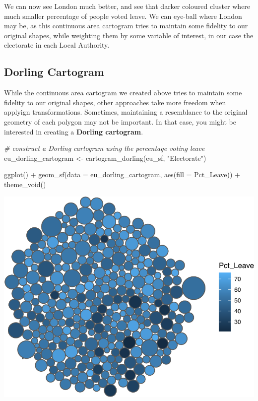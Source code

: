 \documentclass[
  krantz2]{krantz}
\makeatletter
\newenvironment{Shaded}{\begin{snugshade}}{\end{snugshade}}
\newcommand{\AttributeTok}[1]{\textcolor[rgb]{0.61,0.61,0.61}{#1}}
\newcommand{\CommentTok}[1]{\textcolor[rgb]{0.37,0.37,0.37}{\textit{#1}}}
\newcommand{\FunctionTok}[1]{\textcolor[rgb]{0,0,0}{#1}}
\newcommand{\NormalTok}[1]{#1}
\newcommand{\OtherTok}[1]{\textcolor[rgb]{0.37,0.37,0.37}{#1}}
\newcommand{\SpecialCharTok}[1]{\textcolor[rgb]{0,0,0}{#1}}
\newcommand{\StringTok}[1]{\textcolor[rgb]{0.5,0.5,0.5}{#1}}
\newenvironment{kframe}{%
\medskip{}
\setlength{\fboxsep}{.8em}
 \def\at@end@of@kframe{}%
 \ifinner\ifhmode%
  \def\at@end@of@kframe{\end{minipage}}%
  \begin{minipage}{\columnwidth}%
 \fi\fi%
 \def\FrameCommand##1{\hskip\@totalleftmargin \hskip-\fboxsep
 \colorbox{shadecolor}{##1}\hskip-\fboxsep
     \hskip-\linewidth \hskip-\@totalleftmargin \hskip\columnwidth}%
 \MakeFramed {\advance\hsize-\width
   \@totalleftmargin\z@ \linewidth\hsize
   \@setminipage}}%
 {\par\unskip\endMakeFramed%
 \at@end@of@kframe}
\renewenvironment{Shaded}{\begin{kframe}}{\end{kframe}}
\makeatother
\begin{document}
We can now see London much better, and see that darker coloured cluster where much smaller percentage of people voted leave. We can eye-ball where London may be, as this continuous area cartogram tries to maintain some fidelity to our original shapes, while weighting them by some variable of interest, in our case the electorate in each Local Authority.

\hypertarget{dorling-cartogram}{%
\subsection{Dorling Cartogram}\label{dorling-cartogram}}

While the continuous area cartogram we created above tries to maintain some fidelity to our original shapes, other approaches take more freedom when applyign transformations. Sometimes, maintaining a resemblance to the original geometry of each polygon may not be important. In that case, you might be interested in creating a \textbf{Dorling cartogram}.

\begin{Shaded}
\begin{Highlighting}[]
\CommentTok{\# construct a Dorling cartogram using the percentage voting leave}
\NormalTok{eu\_dorling\_cartogram }\OtherTok{\textless{}{-}} \FunctionTok{cartogram\_dorling}\NormalTok{(eu\_sf, }\StringTok{"Electorate"}\NormalTok{)}
\end{Highlighting}
\end{Shaded}

\begin{Shaded}
\begin{Highlighting}[]
\FunctionTok{ggplot}\NormalTok{() }\SpecialCharTok{+}
  \FunctionTok{geom\_sf}\NormalTok{(}\AttributeTok{data =}\NormalTok{ eu\_dorling\_cartogram, }\FunctionTok{aes}\NormalTok{(}\AttributeTok{fill =}\NormalTok{ Pct\_Leave)) }\SpecialCharTok{+} 
  \FunctionTok{theme\_void}\NormalTok{()}
\end{Highlighting}
\end{Shaded}

\includegraphics{crime_mapping_files/figure-latex/unnamed-chunk-139-1.pdf}
\end{document}
